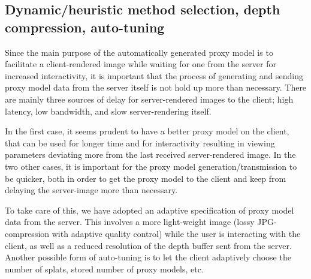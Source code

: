 \subsection{Dynamic/heuristic method selection, depth compression, auto-tuning}
\label{sec:autoTuning}

Since the main purpose of the automatically generated proxy model is to
facilitate a client-rendered image while waiting for one from the server for
increased interactivity, it is important that the process of generating and
sending proxy model data from the server itself is not hold up more than
necessary. There are mainly three sources of delay for server-rendered images to
the client; high latency, low bandwidth, and slow server-rendering itself.

In the first case, it seems prudent to have a better proxy model on the client,
that can be used for longer time and for interactivity resulting in viewing
parameters deviating more from the last received server-rendered image. In the
two other cases, it is important for the proxy model generation/transmission to
be quicker, both in order to get the proxy model to the client and keep from
delaying the server-image more than necessary.

To take care of this, we have adopted an adaptive specification of
proxy model data from the server. This involves a more light-weight image (lossy
JPG-compression with adaptive quality control) while the user is interacting
with the client, as well as a reduced resolution of the depth buffer sent from
the server. Another possible form of auto-tuning is to let the client adaptively
choose the number of splats, stored number of proxy models, etc.



